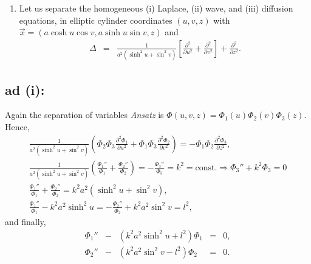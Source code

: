 {\begin{enumerate}
\item
Let us separate the homogeneous
(i)  Laplace,
(ii) wave,
 and
(iii) diffusion    equations,
in
elliptic cylinder coordinates $(u,v,z)$ with
$\vec x = \left( a \cosh u \cos v, a \sinh u \sin v, z\right)$ and
\begin{eqnarray*}
  \Delta & = &  \frac{1}{a^2(\sinh^2u+\sin^2v)}
    \left[
      \frac{\partial^2}{\partial u^2}+
      \frac{\partial^2}{\partial v^2}
    \right]+\frac{\partial^2}{\partial z^2}.
\end{eqnarray*}

\end{enumerate}

\subsection*{ad (i):}
Again the separation of variables {\it Ansatz} is $\Phi(u,v,z)=\Phi_1(u)\Phi_2(v)\Phi_3(z)$.
Hence,
\begin{equation}
\begin{split}
  \frac{1}{a^2(\sinh^2u+\sin^2v)}
  \left(
    \Phi_2\Phi_3\frac{\partial^2\Phi_1}{\partial u^2}+
    \Phi_1\Phi_3\frac{\partial^2\Phi_2}{\partial v^2}
  \right)
  =-\Phi_1\Phi_2\frac{\partial^2\Phi_3}{\partial z^2},
\\
  \frac{1}{a^2(\sinh^2u+\sin^2v)}
  \left(
    \frac{\Phi_1''}{\Phi_1}+
    \frac{\Phi_2''}{\Phi_2}
  \right)=
  -\frac{\Phi_3''}{\Phi_3}=k^2=\mbox{const.}
  \Longrightarrow \Phi_3''+k^2\Phi_3=0
\\
  \frac{\Phi_1''}{\Phi_1}+
  \frac{\Phi_2''}{\Phi_2}=k^2a^2(\sinh^2u+\sin^2v),
\\
  \frac{\Phi_1''}{\Phi_1}-k^2a^2\sinh^2u=
  -\frac{\Phi_2''}{\Phi_2}+k^2a^2\sin^2v=l^2,
\end{split}
\end{equation}
and finally,
$$
  \begin{array}{rcccl}
    \Phi_1'' & - & (k^2a^2\sinh^2u+l^2)\Phi_1 & = & 0, \\
    \Phi_2'' & - & (k^2a^2\sin^2v-l^2)\Phi_2 & = & 0.
  \end{array}
$$


}
